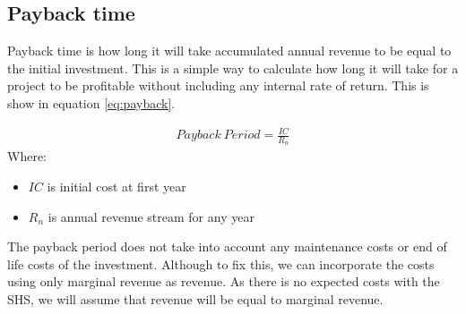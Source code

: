 \subsection{Payback time}
Payback time is how long it will take accumulated annual revenue to be equal to the initial investment. This is a simple way to calculate how long it will take for a project to be profitable without including any internal rate of return\citep{dahlquistPrinciplesFinance2022}. This is show in equation \eqref{eq:payback}.

\begin{align}
    Payback\ Period = \frac{IC}{R_n}
    \label{eq:payback}
\end{align}
Where:
\begin{itemize}
    \item $IC$ is initial cost at first year
    \item $R_n$ is annual revenue stream for any year
\end{itemize}

The payback period does not take into account any maintenance costs or end of life costs of the investment. Although to fix this, we can incorporate the costs using only marginal revenue as revenue. As there is no expected costs with the SHS, we will assume that revenue will be equal to marginal revenue.  


